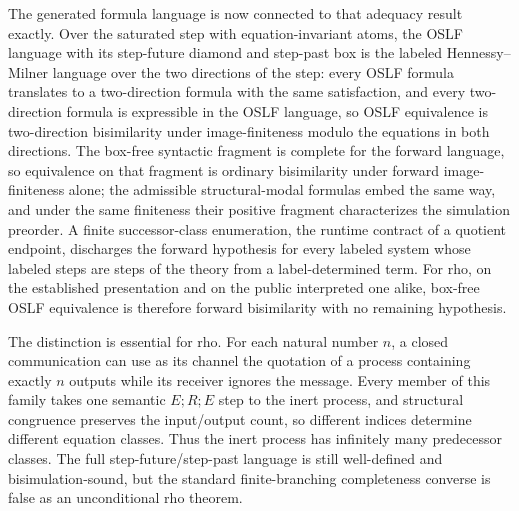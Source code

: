 \documentclass[11pt]{article}
\theoremstyle{definition}
\theoremstyle{remark}
\begin{document}
The generated formula language is now connected to that adequacy result
exactly.  Over the saturated step with equation-invariant atoms, the OSLF
language with its step-future diamond and step-past box is the labeled
Hennessy--Milner language over the two directions of the step: every OSLF
formula translates to a two-direction formula with the same satisfaction, and
every two-direction formula is expressible in the OSLF language, so OSLF
equivalence is two-direction bisimilarity under image-finiteness modulo the
equations in both directions.  The box-free syntactic fragment is complete for
the forward language, so equivalence on that fragment is ordinary bisimilarity
under forward image-finiteness alone; the admissible structural-modal formulas
embed the same way, and under the same finiteness their positive fragment
characterizes the simulation preorder.  A finite successor-class enumeration,
the runtime contract of a quotient endpoint, discharges the forward hypothesis
for every labeled system whose labeled steps are steps of the theory from a
label-determined term.  For rho, on the established presentation and on the
public interpreted one alike, box-free OSLF equivalence is therefore forward
bisimilarity with no remaining hypothesis.

The distinction is essential for rho.  For each natural number $n$, a closed
communication can use as its channel the quotation of a process containing
exactly $n$ outputs while its receiver ignores the message.  Every member of
this family takes one semantic $E;R;E$ step to the inert process, and structural
congruence preserves the input/output count, so different indices determine
different equation classes.  Thus the inert process has infinitely many
predecessor classes.  The full step-future/step-past language is still
well-defined and bisimulation-sound, but the standard finite-branching
completeness converse is false as an unconditional rho theorem.
\end{document}
